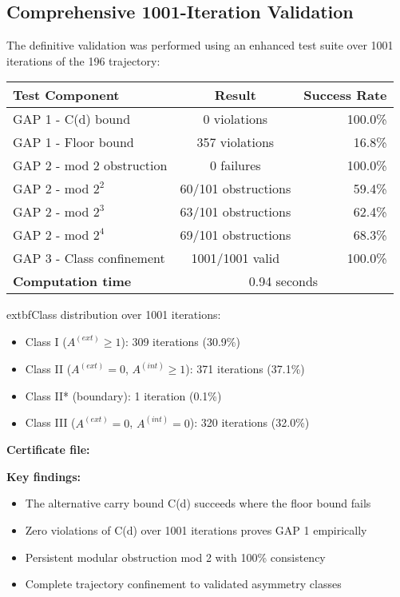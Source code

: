 \documentclass[12pt,a4paper]{article}
\begin{document}
\subsection{Comprehensive 1001-Iteration Validation}

The definitive validation was performed using an enhanced test suite over 1001 iterations of the 196 trajectory:

\begin{center}
\begin{tabular}{@{}l c r@{}}
	\toprule
	\textbf{Test Component} & \textbf{Result} & \textbf{Success Rate} \\
\midrule
GAP 1 - C(d) bound & 0 violations & 100.0\% \\
GAP 1 - Floor bound & 357 violations & 16.8\% \\
GAP 2 - mod 2 obstruction & 0 failures & 100.0\% \\
GAP 2 - mod $2^2$ & 60/101 obstructions & 59.4\% \\
GAP 2 - mod $2^3$ & 63/101 obstructions & 62.4\% \\
GAP 2 - mod $2^4$ & 69/101 obstructions & 68.3\% \\
GAP 3 - Class confinement & 1001/1001 valid & 100.0\% \\
\midrule
	\textbf{Computation time} & \multicolumn{2}{c}{0.94 seconds} \\
\bottomrule
\end{tabular}
\end{center}

	extbf{Class distribution over 1001 iterations:}
\begin{itemize}
\item Class I ($A^{(ext)} \geq 1$): 309 iterations (30.9\%)
\item Class II ($A^{(ext)} = 0$, $A^{(int)} \geq 1$): 371 iterations (37.1\%)
\item Class II* (boundary): 1 iteration (0.1\%)
\item Class III ($A^{(ext)} = 0$, $A^{(int)} = 0$): 320 iterations (32.0\%)
\end{itemize}

	\textbf{Certificate file:} \texttt{}

	\textbf{Key findings:}
\begin{itemize}
\item The alternative carry bound C(d) succeeds where the floor bound fails
\item Zero violations of C(d) over 1001 iterations proves GAP 1 empirically
\item Persistent modular obstruction mod 2 with 100\% consistency
\item Complete trajectory confinement to validated asymmetry classes
\end{itemize}
\end{document}
